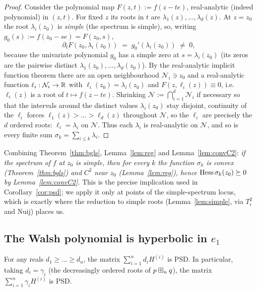 \begin{proof}
Consider the polynomial map $F(z,t):=f(z-te)$, real-analytic (indeed polynomial)
in $(z,t)$. For fixed $z$ its roots in $t$ are $\lambda_1(z),\dots,\lambda_d(z)$.
At $z=z_0$ the root $\lambda_i(z_0)$ is \emph{simple} (the spectrum is simple),
so, writing $g_0(s):=f(z_0-se)=F(z_0,s)$,
\[
\partial_t F(z_0,\lambda_i(z_0))\;=\;g_0'(\lambda_i(z_0))\;\ne\;0 ,
\]
because the univariate polynomial $g_0$ has a simple zero at $s=\lambda_i(z_0)$
(its zeros are the pairwise distinct $\lambda_1(z_0),\dots,\lambda_d(z_0)$). By the
real-analytic implicit function theorem there are an open neighbourhood
$\mathcal N_i\ni z_0$ and a real-analytic function
$\ell_i:\mathcal N_i\to\mathbb{R}$ with $\ell_i(z_0)=\lambda_i(z_0)$ and
$F(z,\ell_i(z))\equiv0$, i.e.\ $\ell_i(z)$ is a root of $t\mapsto f(z-te)$.
Shrinking $\mathcal N:=\bigcap_{i=1}^d\mathcal N_i$ if necessary so that the
intervals around the distinct values $\lambda_i(z_0)$ stay disjoint, continuity of
the $\ell_i$ forces $\ell_1(z)>\dots>\ell_d(z)$ throughout $\mathcal N$, so the
$\ell_i$ are precisely the $d$ ordered roots: $\ell_i=\lambda_i$ on $\mathcal N$.
Thus each $\lambda_i$ is real-analytic on $\mathcal N$, and so is every finite sum
$\sigma_k=\sum_{i\le k}\lambda_i$.
\end{proof}

\noindent Combining Theorem~\ref{thm:bgls}, Lemma~\ref{lem:reg} and
Lemma~\ref{lem:convC2}: \emph{if the spectrum of $f$ at $z_0$ is simple, then for
every $k$ the function $\sigma_k$ is convex (Theorem~\ref{thm:bgls}) and $C^2$
near $z_0$ (Lemma~\ref{lem:reg}), hence $\operatorname{Hess}\sigma_k(z_0)\succeq 0$ by
Lemma~\ref{lem:convC2}.} This is the precise implication used in
Corollary~\ref{cor:psd}; we apply it only at points of the simple-spectrum
locus, which is exactly where the reduction to simple roots (Lemma~\ref{lem:simple},
via $T_\epsilon^2$ and Nuij) places us.

\subsection*{The Walsh polynomial is hyperbolic in $e_1$}

\begin{qfourcorollary}\label{cor:psd}
For any reals $d_1\ge\dots\ge d_n$, the matrix $\sum_{i=1}^n d_i H^{(i)}$ is PSD.
In particular, taking $d_i=\gamma_i$ (the decreasingly ordered roots of
$p\boxplus_n q$), the matrix $\sum_{i=1}^n\gamma_i H^{(i)}$ is PSD.
\end{qfourcorollary}


